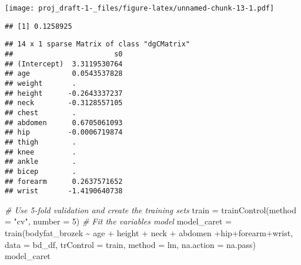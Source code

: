 \documentclass[
]{article}
\newenvironment{Shaded}{\begin{snugshade}}{\end{snugshade}}
\newcommand{\AttributeTok}[1]{\textcolor[rgb]{0.77,0.63,0.00}{#1}}
\newcommand{\CommentTok}[1]{\textcolor[rgb]{0.56,0.35,0.01}{\textit{#1}}}
\newcommand{\DecValTok}[1]{\textcolor[rgb]{0.00,0.00,0.81}{#1}}
\newcommand{\FunctionTok}[1]{\textcolor[rgb]{0.00,0.00,0.00}{#1}}
\newcommand{\NormalTok}[1]{#1}
\newcommand{\OtherTok}[1]{\textcolor[rgb]{0.56,0.35,0.01}{#1}}
\newcommand{\SpecialCharTok}[1]{\textcolor[rgb]{0.00,0.00,0.00}{#1}}
\newcommand{\StringTok}[1]{\textcolor[rgb]{0.31,0.60,0.02}{#1}}
\begin{document}
\texttt{[image: proj\_draft-1-\_files/figure-latex/unnamed-chunk-13-1.pdf]}

\begin{Shaded}
\end{Shaded}

\begin{verbatim}
## [1] 0.1258925
\end{verbatim}

\begin{Shaded}
\end{Shaded}

\begin{verbatim}
## 14 x 1 sparse Matrix of class "dgCMatrix"
##                        s0
## (Intercept)  3.3119530764
## age          0.0543537828
## weight       .           
## height      -0.2643337237
## neck        -0.3128557105
## chest        .           
## abdomen      0.6705061093
## hip         -0.0006719874
## thigh        .           
## knee         .           
## ankle        .           
## bicep        .           
## forearm      0.2637571652
## wrist       -1.4190640738
\end{verbatim}

\begin{Shaded}
\begin{Highlighting}[]
\CommentTok{\# Use 5{-}fold validation and create the training sets}
\NormalTok{train }\OtherTok{=} \FunctionTok{trainControl}\NormalTok{(}\AttributeTok{method =} \StringTok{"cv"}\NormalTok{, }\AttributeTok{number =} \DecValTok{5}\NormalTok{)}
\CommentTok{\# Fit the variables model }
\NormalTok{model\_caret }\OtherTok{=} \FunctionTok{train}\NormalTok{(bodyfat\_brozek }\SpecialCharTok{\textasciitilde{}}\NormalTok{ age }\SpecialCharTok{+}\NormalTok{  height }\SpecialCharTok{+}\NormalTok{ neck }\SpecialCharTok{+}\NormalTok{ abdomen }\SpecialCharTok{+}\NormalTok{hip}\SpecialCharTok{+}\NormalTok{forearm}\SpecialCharTok{+}\NormalTok{wrist,}
\AttributeTok{data =}\NormalTok{ bd\_df,}
\AttributeTok{trControl =}\NormalTok{ train,}
\AttributeTok{method =} \StringTok{\textquotesingle{}lm\textquotesingle{}}\NormalTok{,}
\AttributeTok{na.action =}\NormalTok{ na.pass)}
\NormalTok{model\_caret}
\end{Highlighting}
\end{Shaded}
\end{document}

